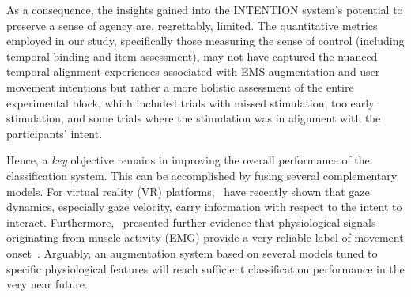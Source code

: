 As a consequence, the insights gained into the INTENTION system's potential to preserve a sense of agency are, regrettably, limited. The quantitative metrics employed in our study, specifically those measuring the sense of control (including temporal binding and item assessment), may not have captured the nuanced temporal alignment experiences associated with EMS augmentation and user movement intentions but rather a more holistic assessment of the entire experimental block, which included trials with missed stimulation, too early stimulation, and some trials where the stimulation was in alignment with the participants' intent.

Hence, a \textit{key} objective remains in improving the overall performance of the classification system. This can be accomplished by fusing several complementary models. For virtual reality (VR) platforms,~\citet{David-John2021-vg} have recently shown that gaze dynamics, especially gaze velocity, carry information with respect to the intent to interact. Furthermore,~\citet{Nguyen2023-me} presented further evidence that physiological signals originating from muscle activity (EMG) provide a very reliable label of movement onset~\cite{Nguyen2023-me}. Arguably, an augmentation system based on several models tuned to specific physiological features will reach sufficient classification performance in the very near future.

